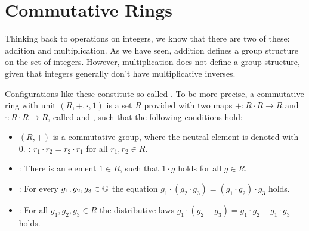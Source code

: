 
\section{Commutative Rings}\label{sec:rings}
Thinking back to operations on integers, we know that there are two of these: addition and multiplication. As we have seen, addition defines a group structure on the set of integers. However, multiplication does not define a group structure, given that integers generally don't have multiplicative inverses.

Configurations like these constitute so-called . To be more precise, a commutative ring with unit $ (R, +, \cdot, 1) $ is a set $R$ provided with two maps $ +: R \cdot R \to R $ and $ \cdot: R \cdot R \to R $, called  and , such that the following conditions hold:

\begin{definition}{}\label{def:comm-ring-unit}
\begin{itemize}
\item $ \left (R, + \right) $ is a commutative group, where the neutral element is denoted  with $ 0 $.
: $r_1\cdot r_2 = r_2\cdot r_1$ for all $r_1, r_2\in R$.
\item {}: There is an element $1\in R$, such that $1\cdot g$ holds for all $g\in R$,
\item {}: For every $g_1,g_2,g_3\in\mathbb{G}$ the equation
$g_1\cdot(g_2\cdot g_3) = (g_1\cdot g_2)\cdot g_3$ holds.
\item {}: For all $ g_1, g_2, g_3 \in R $ the distributive laws
$ g_1 \cdot \left (g_2 + g_3 \right) = g_1 \cdot g_2 + g_1 \cdot g_3$ holds.
\end{itemize}
\end{definition}

